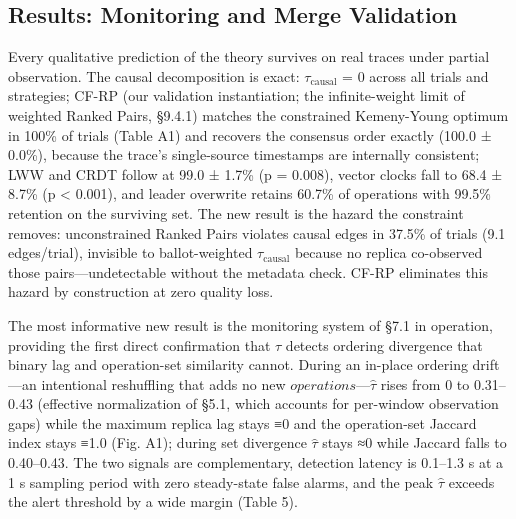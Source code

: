\documentclass[10pt,twocolumn]{article}
\begin{document}
\subsection{Results: Monitoring and Merge Validation}
Every qualitative prediction of the theory survives on real traces under partial observation. The causal decomposition is exact: $\tau_{\mathrm{causal}}$ = 0 across all trials and strategies; CF-RP (our validation instantiation; the infinite-weight limit of weighted Ranked Pairs, §9.4.1) matches the constrained Kemeny-Young optimum in 100\% of trials (Table A1) and recovers the consensus order exactly (100.0 ± 0.0\%), because the trace's single-source timestamps are internally consistent; LWW and CRDT follow at 99.0 ± 1.7\% (p = 0.008), vector clocks fall to 68.4 ± 8.7\% (p < 0.001), and leader overwrite retains 60.7\% of operations with 99.5\% retention on the surviving set. The new result is the hazard the constraint removes: unconstrained Ranked Pairs violates causal edges in 37.5\% of trials (9.1 edges/trial), invisible to ballot-weighted $\tau_{\mathrm{causal}}$ because no replica co-observed those pairs—undetectable without the metadata check. CF-RP eliminates this hazard by construction at zero quality loss.

The most informative new result is the monitoring system of §7.1 in operation, providing the first direct confirmation that $\tau$ detects ordering divergence that binary lag and operation-set similarity cannot. During an in-place ordering drift—an intentional reshuffling that adds no new $operations—\hat{\tau}$ rises from 0 to 0.31–0.43 (effective normalization of §5.1, which accounts for per-window observation gaps) while the maximum replica lag stays ≡0 and the operation-set Jaccard index stays ≡1.0 (Fig. A1); during set divergence $\hat{\tau}$ stays ≈0 while Jaccard falls to 0.40–0.43. The two signals are complementary, detection latency is 0.1–1.3 s at a 1 s sampling period with zero steady-state false alarms, and the peak $\hat{\tau}$ exceeds the alert threshold by a wide margin (Table 5).
\end{document}
